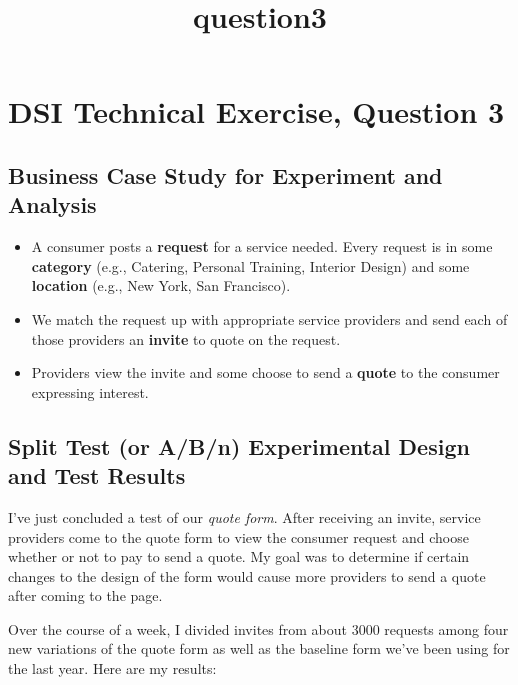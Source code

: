 \documentclass[11pt]{article}
\title{question3}
\providecommand{\tightlist}{%
      \setlength{\itemsep}{0pt}\setlength{\parskip}{0pt}}
\begin{document}
    
    
    \maketitle
    
    

    
    \section{DSI Technical Exercise, Question
3}\label{dsi-technical-exercise-question-3}

    \subsection{Business Case Study for Experiment and
Analysis}\label{business-case-study-for-experiment-and-analysis}

\begin{itemize}
\tightlist
\item
  A consumer posts a \textbf{request} for a service needed. Every
  request is in some \textbf{category} (e.g., Catering, Personal
  Training, Interior Design) and some \textbf{location} (e.g., New York,
  San Francisco).\\
\item
  We match the request up with appropriate service providers and send
  each of those providers an \textbf{invite} to quote on the request.\\
\item
  Providers view the invite and some choose to send a \textbf{quote} to
  the consumer expressing interest.
\end{itemize}

    \subsection{Split Test (or A/B/n) Experimental Design and Test
Results}\label{split-test-or-abn-experimental-design-and-test-results}

I've just concluded a test of our \emph{quote form}. After receiving an
invite, service providers come to the quote form to view the consumer
request and choose whether or not to pay to send a quote. My goal was to
determine if certain changes to the design of the form would cause more
providers to send a quote after coming to the page.

Over the course of a week, I divided invites from about 3000 requests
among four new variations of the quote form as well as the baseline form
we've been using for the last year. Here are my results:
\end{document}
